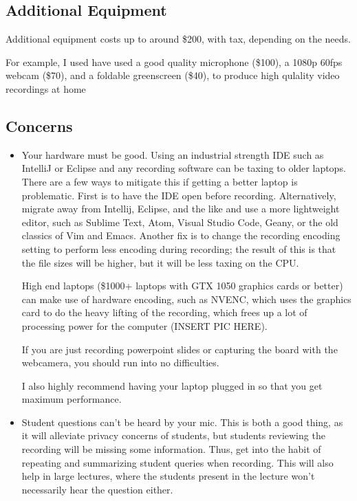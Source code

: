 \documentclass[sigconf]{acmart}
\begin{document}
\subsection{Additional Equipment}
Additional equipment costs up to around \$200, with tax, depending on the needs.

For example, I used have used a good quality microphone (\$100), a 1080p 60fps webcam (\$70), and a foldable greenscreen (\$40), to produce high qulality video recordings at home


\subsection{Concerns}
\begin{itemize}
	\item Your hardware must be good. Using an industrial strength IDE such as IntelliJ or Eclipse and any recording software can be taxing to older laptops.
	There are a few  ways to mitigate this  if getting a better laptop is problematic. 
	First is to have the IDE open before recording.
	Alternatively, migrate away from Intellij, Eclipse, and the like and use a more lightweight editor, such as Sublime Text, Atom, Visual Studio Code, Geany, or the old classics of Vim and Emacs.
	Another fix is to change the recording encoding setting to perform less encoding during recording; the result of this is that the file sizes will be higher, but it will be less taxing on the CPU.
	
	High end laptops (\$1000+ laptops with GTX 1050 graphics cards or better) can make use of hardware encoding, such as NVENC, which uses the graphics card to do the heavy lifting of the recording, which frees up a lot of processing power for the computer (INSERT PIC HERE).
	
	
	If you are just recording powerpoint slides or capturing the board with the webcamera, you should run into no difficulties.
	
	I also highly recommend having your laptop plugged in  so that you get maximum performance.
	\item Student questions can't be heard by your mic.  This is both a good thing, as it will alleviate privacy concerns of students, but students  reviewing the recording will be missing some information.  Thus, get into the habit of repeating and summarizing student queries when recording.  This will also help in large lectures, where the students present in the lecture won't necessarily hear the question either.
	
\end{itemize}
\end{document}
